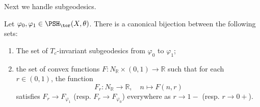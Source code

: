 Next we handle subgeodesics.
\begin{proposition}\label{prop:toricsubgeod}
    Let $\varphi_0,\varphi_1\in \PSH_{\tor}(X,\theta)$.
    There is a canonical bijection between the following sets:
    \begin{enumerate}
        \item\label{itm:prop:toricsubgeod:1} The set of $T_c$-invariant subgeodesics from $\varphi_0$ to $\varphi_1$;
        \item\label{itm:prop:toricsubgeod:2} the set of convex functions $F\colon N_{\mathbb{R}}\times (0,1)\rightarrow \mathbb{R}$ such that for each $r\in (0,1)$, the function
        \begin{equation}\label{eq:Ftdefsubgeo}
        F_r\colon N_{\mathbb{R}}\rightarrow \mathbb{R},\quad n\mapsto F(n,r)
        \end{equation}
        satisfies $F_r\to F_{\varphi_1}$ (resp. $F_r\to F_{\varphi_0}$) everywhere as $r\to 1-$ (resp. $r\to 0+$).
    \end{enumerate}
\end{proposition}


